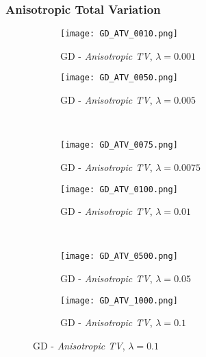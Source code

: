 \documentclass{report}
\begin{document}
			\subsubsection*{Anisotropic Total Variation}
			\begin{figure}[H] \renewcommand\thesubfigure{GD.ATV.\arabic{subfigure}}
				\centering
				\begin{subfigure}[b]{0.45\textwidth}
					\texttt{[image: GD\_ATV\_0010.png]}
					\caption{GD - \textit{Anisotropic TV}, $\lambda = 0.001$}
					\label{fig:GD_ATV001}
				\end{subfigure}
				\begin{subfigure}[b]{0.45\textwidth}
					\texttt{[image: GD\_ATV\_0050.png]}
					\caption{GD - \textit{Anisotropic TV}, $\lambda = 0.005$}
					\label{fig:GD_ATV005}
				\end{subfigure}
				\\
				\centering
				\begin{subfigure}[b]{0.45\textwidth}
					\texttt{[image: GD\_ATV\_0075.png]}
					\caption{GD - \textit{Anisotropic TV}, $\lambda = 0.0075$}
					\label{fig:GD_ATV0075}
				\end{subfigure}
				\begin{subfigure}[b]{0.45\textwidth}
					\texttt{[image: GD\_ATV\_0100.png]}
					\caption{GD - \textit{Anisotropic TV}, $\lambda = 0.01$}
					\label{fig:GD_ATV01}
				\end{subfigure}
				\\
				\centering
				\begin{subfigure}[b]{0.45\textwidth}
					\texttt{[image: GD\_ATV\_0500.png]}
					\caption{GD - \textit{Anisotropic TV}, $\lambda = 0.05$}
					\label{fig:GD_ATV05}
				\end{subfigure}
				\begin{subfigure}[b]{0.45\textwidth}
					\texttt{[image: GD\_ATV\_1000.png]}
					\caption{GD - \textit{Anisotropic TV}, $\lambda = 0.1$}
					\label{fig:GD_ATV1}
				\end{subfigure}
			\end{figure}
		\closesection
	\closesection
	\newpage
\end{document}
